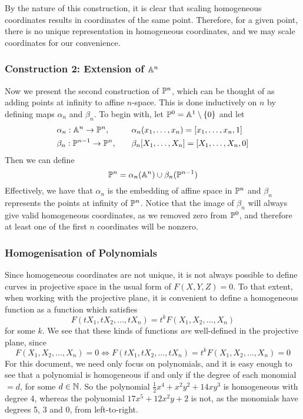 By the nature of this construction, it is clear that scaling homogeneous coordinates results in coordinates of the same point.
Therefore, for a given point, there is no unique representation in homogeneous coordinates, and we may scale coordinates for our convenience.

\subsubsection{Construction 2: Extension of $\an[n]$}
Now we present the second construction of $\pn$, which can be thought of as adding points at infinity to affine $n$-space.
This is done inductively on $n$ by defining maps $\alpha_n$ and $\beta_n$.
To begin with, let $\pn[0] = \an[1] \setminus \{0\}$ and let
\begin{alignat*}{2}
&\alpha_n : \an \rightarrow \pn,\quad &&\alpha_n(x_1,\ldots,x_n) = [x_1,\ldots,x_n,1]\\
 &\beta_n : \pn[n-1] \rightarrow \pn,\quad &&\beta_n[X_1,\ldots,X_n] = [X_1,\ldots,X_n,0]
\end{alignat*}
Then we can define
$$\pn = \alpha_n(\an) \cup \beta_n(\pn[n-1])$$
Effectively, we have that $\alpha_n$ is the embedding of affine space in $\pn$ and $\beta_n$ represents the points at infinity of $\pn$.
Notice that the image of $\beta_n$ will always give valid homogeneous coordinates, as we removed zero from $\pn[0]$, and therefore at least one of the first $n$ coordinates will be nonzero.
\subsubsection{Homogenisation of Polynomials}
Since homogeneous coordinates are not unique, it is not always possible to define curves in projective space in the usual form of $F(X,Y,Z)=0$. To that extent, when working with the projective plane, it is convenient to define a homogeneous function as a function which satisfies
$$F(tX_1,tX_2,\ldots,tX_n)=t^k F(X_1,X_2,\ldots,X_n)$$
for some $k$. We see that these kinds of functions \emph{are} well-defined in the projective plane, since
$$F(X_1,X_2,\ldots,X_n)=0 \Leftrightarrow F(tX_1,tX_2,\ldots,tX_n) = t^k F(X_1,X_2,\ldots,X_n) = 0$$
For this document, we need only focus on polynomials, and it is easy enough to see that a polynomial is homogeneous if and only if the degree of each monomial $= d$, for some $d \in \N$.
So the polynomial $\frac{1}{2}x^4 + x^2y^2 + 14xy^3$ is homogeneous with degree 4, whereas the polynomial $17x^5 + 12x^2y + 2$ is not, as the monomials have degrees 5, 3 and 0, from left-to-right.

